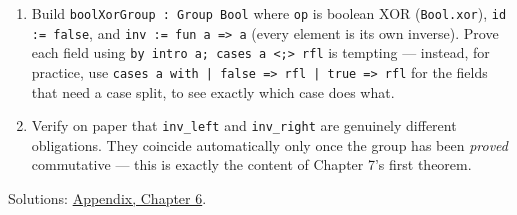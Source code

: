 \begin{enumerate}
\item
  Build \texttt{boolXorGroup : Group Bool} where \texttt{op} is boolean XOR (\texttt{Bool.xor}), \texttt{id := false}, and \texttt{inv := fun a => a} (every element is its own inverse). Prove each field using \texttt{by intro a; cases a <;> rfl} is tempting --- instead, for practice, use \texttt{cases a with | false => rfl | true => rfl} for the fields that need a case split, to see exactly which case does what.
\item
  Verify on paper that \texttt{inv\_\allowbreak{}left} and \texttt{inv\_\allowbreak{}right} are genuinely different obligations. They coincide automatically only once the group has been \emph{proved} commutative --- this is exactly the content of Chapter 7's first theorem.
\end{enumerate}

Solutions: \hyperref[sec:14-appendix-solutions:05-chapter-6:1]{Appendix, Chapter 6}.

